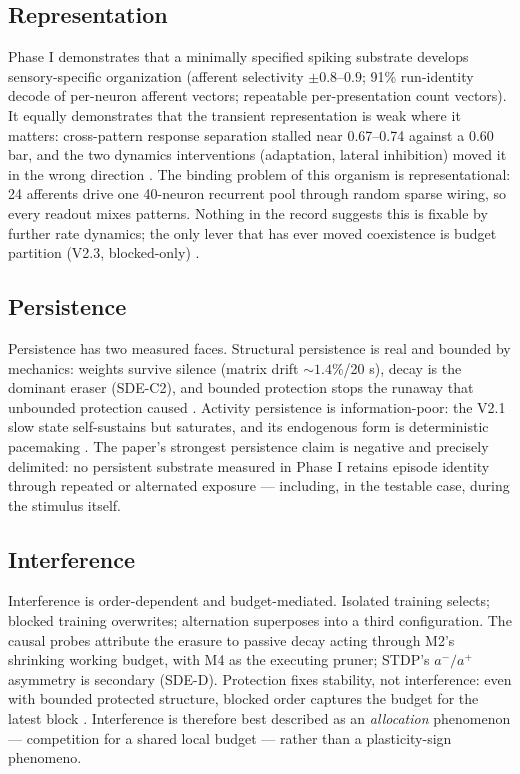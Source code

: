 \subsection{Representation}

Phase I demonstrates that a minimally specified spiking substrate
develops sensory-specific organization (afferent selectivity
\(\pm 0.8\)--\(0.9\); 91\% run-identity decode of per-neuron afferent
vectors; repeatable per-presentation count vectors). It equally
demonstrates that the transient representation is weak where it
matters: cross-pattern response separation stalled near 0.67--0.74
against a 0.60 bar, and the two dynamics interventions (adaptation,
lateral inhibition) moved it in the wrong direction
\cite{e1proto,e3bproto}. The binding problem of this organism is
representational: 24 afferents drive one 40-neuron recurrent pool
through random sparse wiring, so every readout mixes patterns. Nothing
in the record suggests this is fixable by further rate dynamics; the
only lever that has ever moved coexistence is budget partition (V2.3,
blocked-only) \cite{overview,synmem}.

\subsection{Persistence}

Persistence has two measured faces. Structural persistence is real and
bounded by mechanics: weights survive silence (matrix drift \(\sim
1.4\%\)/20 s), decay is the dominant eraser (SDE-C2), and bounded
protection stops the runaway that unbounded protection caused
\cite{bbounded,cllarecord}. Activity persistence is information-poor:
the V2.1 slow state self-sustains but saturates, and its endogenous
form is deterministic pacemaking \cite{infoaudit}. The paper's
strongest persistence claim is negative and precisely delimited: no
persistent substrate measured in Phase I retains episode identity
through repeated or alternated exposure --- including, in the testable
case, during the stimulus itself.

\subsection{Interference}

Interference is order-dependent and budget-mediated. Isolated
training selects; blocked training overwrites; alternation superposes
into a third configuration. The causal probes attribute the erasure to
passive decay acting through M2's shrinking working budget, with M4 as
the executing pruner; STDP's \(a^-/a^+\) asymmetry is secondary
(SDE-D). Protection fixes stability, not interference: even with
bounded protected structure, blocked order captures the budget for the
latest block \cite{capability}. Interference is therefore best
described as an \emph{allocation} phenomenon --- competition for a
shared local budget --- rather than a plasticity-sign phenomeno.

